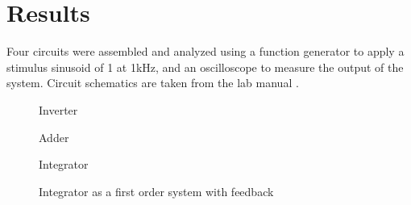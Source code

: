 \section{Results}\label{sec:results}
Four circuits were assembled and analyzed using a function generator to apply a stimulus sinusoid of 1\si{\voltpp} at 1\si{\kilo\hertz}, and an oscilloscope to measure the output of the system. Circuit schematics are taken from the lab manual \cite{lab-manual}.

\begin{figure}[htbp]
	\centering
	\label{fig:inverter}
	\caption{Inverter}
\end{figure}

\begin{figure}[htbp]
	\centering
	\label{fig:adder}
	\caption{Adder}
\end{figure}

\begin{figure}[htbp]
	\centering
	\label{fig:integrator}
	\caption{Integrator}
\end{figure}

\begin{figure}[htbp]
	\centering
	\label{fig:first-order}
	\caption{Integrator as a first order system with feedback}
\end{figure}

\clearpage
